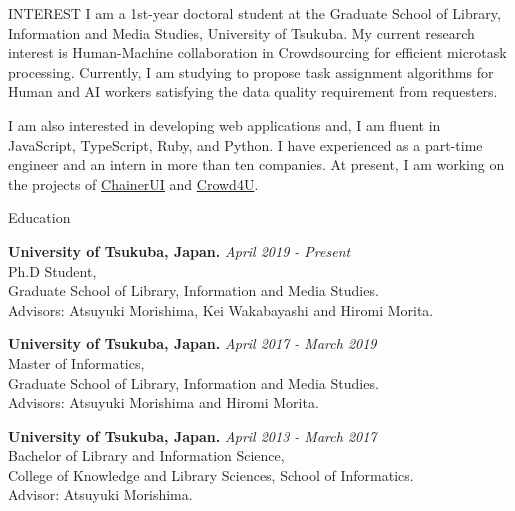 \documentclass{resume} %
\begin{document}
\begin{rSection}{INTEREST}
I am a 1st-year doctoral student at the Graduate School of Library, Information and Media Studies, University of Tsukuba.
My current research interest is Human-Machine collaboration in Crowdsourcing for efficient microtask processing.
Currently, I am studying to propose task assignment algorithms for Human and AI workers satisfying the data quality requirement from requesters.
  
I am also interested in developing web applications and, I am fluent in JavaScript, TypeScript, Ruby, and Python.
I have experienced as a part-time engineer and an intern in more than ten companies.
At present, I am working on the projects of \href{https://github.com/chainer/chainerui}{ChainerUI} and \href{http://crowd4u.org}{Crowd4U}.
  


\end{rSection}


\begin{rSection}{Education}

{\bf University of Tsukuba, Japan. } \hfill {\em April 2019 - Present}
\\ Ph.D Student,
\\ Graduate School of Library, Information and Media Studies.
\\ Advisors: Atsuyuki Morishima, Kei Wakabayashi and Hiromi Morita.

{\bf University of Tsukuba, Japan. } \hfill {\em April 2017 - March 2019}
\\ Master of Informatics,
\\ Graduate School of Library, Information and Media Studies.
\\ Advisors: Atsuyuki Morishima and Hiromi Morita.

{\bf University of Tsukuba, Japan. } \hfill {\em April 2013 - March 2017} 
\\ Bachelor of Library and Information Science,
\\ College of Knowledge and Library Sciences, School of Informatics.
\\ Advisor: Atsuyuki Morishima.
\end{rSection}
\end{document}
